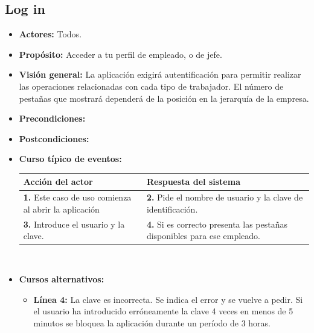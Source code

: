 \documentclass[spanish,a4paper,11pt, twoside]{report}	%
\begin{document}
	\subsection{Log in}		
			\begin{itemize}
			\item \textbf{Actores:} Todos.
			\item \textbf{Propósito:} Acceder a tu perfil de empleado, o de jefe.
			\item \textbf{Visión general:} La aplicación exigirá autentificación para permitir realizar las operaciones relacionadas con cada tipo de trabajador. El número de pestañas que mostrará dependerá de la posición en la jerarquía de la empresa. 
			\item \textbf{Precondiciones:} 
			\item \textbf{Postcondiciones:} 
			\item \textbf{Curso típico de eventos:} 	\\
				\begin{tabular}{|p{6cm}||p{6cm}|}
				\hline
				\textbf{Acción del actor} & \textbf{Respuesta del sistema} \\ \hline \hline
				\textbf{1.} Este caso de uso comienza al abrir la aplicación & \textbf{2.} Pide el nombre de usuario y  la clave de identificación.\\ \hline 
				\textbf{3.} Introduce el usuario y  la clave. & \textbf{4.} Si es correcto presenta las pestañas disponibles para ese empleado.\\ \hline
			\end{tabular}
			\\
			\item \textbf{Cursos alternativos:} 
			\begin{itemize}
			\item  \textbf{Línea 4:} La clave es incorrecta. Se indica el error y se vuelve a pedir. Si el usuario ha introducido erróneamente la clave 4 veces en menos de 5 minutos se bloquea la aplicación durante un período de 3 horas.
			\end {itemize}
		\end{itemize}

	
	\hspace{-0.6 true cm}	
		
\end{document}
